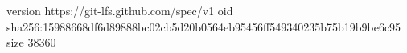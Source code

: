 version https://git-lfs.github.com/spec/v1
oid sha256:15988668df6d89888bc02cb5d20b0564eb95456ff549340235b75b19b9be6c95
size 38360
